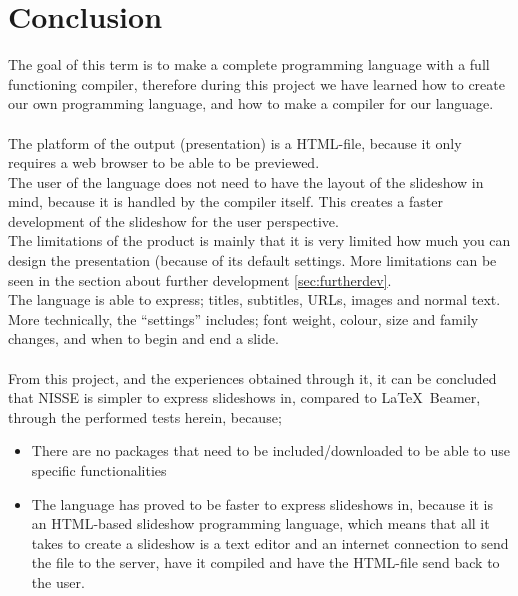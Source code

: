 \chapter{Conclusion}

The goal of this term is to make a complete programming language with a full functioning compiler, therefore during this project we have learned how to create our own programming language, and how to make a compiler for our language. \\

 \\
The platform of the output (presentation) is a HTML-file, because it only requires a web browser to be able to be previewed. \\
The user of the language does not need to have the layout of the slideshow in mind, because it is handled by the compiler itself. This creates a faster development of the slideshow for the user perspective. \\
The limitations of the product is mainly that it is very limited how much you can design the presentation (because of its default settings. More limitations can be seen in the section about further development \ref{sec:furtherdev}. \\
The language is able to express; titles, subtitles, URLs, images and normal text. \\
More technically, the ``settings'' includes; font weight, colour, size and family changes, and when to begin and end a slide.
\\ \\
From this project, and the experiences obtained through it, it can be concluded that NISSE is simpler to express slideshows in, compared to \LaTeX~Beamer, through the performed tests herein, because;
\begin{itemize}
	\item There are no packages that need to be included/downloaded to be able to use specific functionalities
	\item The language has proved to be faster to express slideshows in, because it is an HTML-based slideshow programming language, which means that all it takes to create a slideshow is a text editor and an internet connection to send the file to the server, have it compiled and have the HTML-file send back to the user.
\end{itemize}